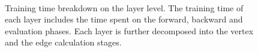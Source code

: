 \begin{figure}[tbp]
    \centering
    \\
    \caption{Training time breakdown on the layer level. The training time of each layer includes the time spent on the forward, backward and evaluation phases. Each layer is further decomposed into the vertex and the edge calculation stages.}
    \label{fig:exp_vertex_edge_cal_proportion}
\end{figure}

